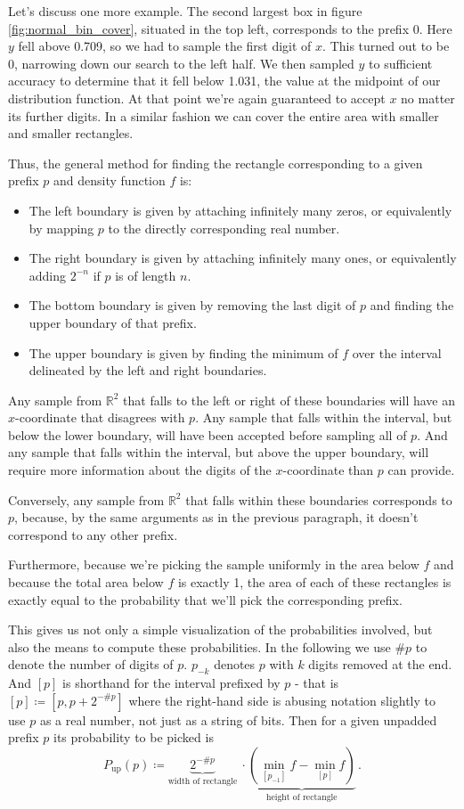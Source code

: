 Let's discuss one more example. The second largest box in figure \ref{fig:normal_bin_cover}, situated in the top left, corresponds to the prefix 0. Here $y$ fell above 0.709, so we had to sample the first digit of $x$. This turned out to be 0, narrowing down our search to the left half. We then sampled $y$ to sufficient accuracy to determine that it fell below 1.031, the value at the midpoint of our distribution function. At that point we're again guaranteed to accept $x$ no matter its further digits. In a similar fashion we can cover the entire area with smaller and smaller rectangles.

Thus, the general method for finding the rectangle corresponding to a given prefix $p$ and density function $f$ is:
\begin{itemize}
    \item The left boundary is given by attaching infinitely many zeros, or equivalently by mapping $p$ to the directly corresponding real number.
    \item The right boundary is given by attaching infinitely many ones, or equivalently adding $2^{-n}$ if $p$ is of length $n$.
    \item The bottom boundary is given by removing the last digit of $p$ and finding the upper boundary of that prefix.
    \item The upper boundary is given by finding the minimum of $f$ over the interval delineated by the left and right boundaries.
\end{itemize}
Any sample from $\mathbb{R}^2$ that falls to the left or right of these boundaries will have an $x$-coordinate that disagrees with $p$. Any sample that falls within the interval, but below the lower boundary, will have been accepted before sampling all of $p$. And any sample that falls within the interval, but above the upper boundary, will require more information about the digits of the $x$-coordinate than $p$ can provide.

Conversely, any sample from $\mathbb{R}^2$ that falls within these boundaries corresponds to $p$, because, by the same arguments as in the previous paragraph, it doesn't correspond to any other prefix.

Furthermore, because we're picking the sample uniformly in the area below $f$ and because the total area below $f$ is exactly 1, the area of each of these rectangles is exactly equal to the probability that we'll pick the corresponding prefix.

This gives us not only a simple visualization of the probabilities involved, but also the means to compute these probabilities. In the following we use $\#p$ to denote the number of digits of $p$. $p_{-k}$ denotes $p$ with $k$ digits removed at the end. And $[p]$ is shorthand for the interval prefixed by $p$ - that is $[p] \coloneqq [p, p+2^{-\#p}]$ where the right-hand side is abusing notation slightly to use $p$ as a real number, not just as a string of bits. Then for a given unpadded prefix $p$ its probability to be picked is
\[
P_{\text{up}}(p) \coloneqq \underbrace{2^{-\#p}}_{\text{width of rectangle}}\:\cdot \underbrace{(\min_{[p_{-1}]} f - \min_{[p]} f)}_{\text{height of rectangle}}\,.
\]

